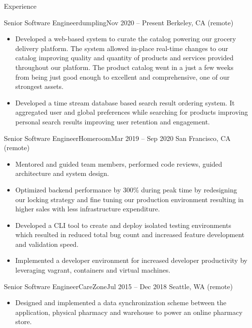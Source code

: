 \documentclass[calibri]{mcdowellcv}
\begin{document}
\begin{cvsection}{Experience}
	\vskip 0.2in
	\begin{cvsubsection}{Senior Software Engineer}{dumpling}{Nov 2020 -- Present}
		Berkeley, CA (remote)
		\begin{itemize}%
			\item Developed a web-based system to curate the catalog powering our grocery delivery platform. The system allowed in-place real-time changes to our catalog improving quality and quantity of products and services provided throughout our platform. The product catalog went in a just a few weeks from being just good enough to excellent and comprehensive, one of our strongest assets.
			\item Developed a time stream database based search result ordering system. It aggregated user and global preferences while searching for products improving personal search results improving user retention and engagement.
		\end{itemize}
	\end{cvsubsection}
	\vskip 0.3in
	\begin{cvsubsection}{Senior Software Engineer}{Homeroom}{Mar 2019 -- Sep 2020}
		San Francisco, CA (remote)
		\begin{itemize}%
			\item Mentored and guided team members, performed code reviews, guided architecture and system design.
			\item Optimized backend performance by 300\% during peak time by redesigning our locking strategy and fine tuning our production environment resulting in higher sales with less infrastructure expenditure.
			\item Developed a CLI tool to create and deploy isolated testing environments which resulted in reduced total bug count and increased feature development and validation speed.
			\item Implemented a developer environment for increased developer productivity by leveraging vagrant, containers and virtual machines.
		\end{itemize}
	\end{cvsubsection}
	\vskip 0.3in
	\begin{cvsubsection}{Senior Software Engineer}{CareZone}{Jul 2015 -- Dec 2018}
		Seattle, WA (remote)
		\begin{itemize}%
			\item Designed and implemented a data synchronization scheme between the application, physical pharmacy and warehouse to power an online pharmacy store.

\end{itemize}
\end{cvsubsection}
\end{cvsection}
\end{document}
